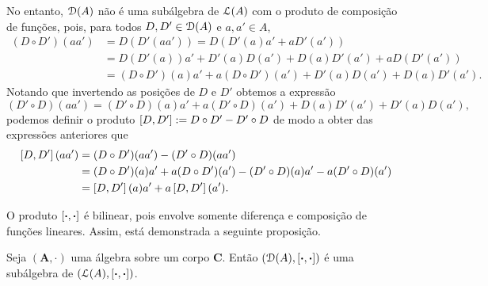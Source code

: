 No entanto, $\mathcal{D}(A)$ não é uma subálgebra de $\mathcal{L}(A)$ com o produto de composição de funções, pois, para todos $D,D' \in \mathcal{D}(A)$ e $a,a' \in A$,
	\begin{align*}
	(D \circ D')(aa') &= D(D'(aa')) = D(D'(a)a' + aD'(a')) \\
		&= D(D'(a))a' + D'(a)D(a') + D(a)D'(a') + a D(D'(a')) \\
		&= (D \circ D')(a)a' + a (D \circ D')(a') + D'(a)D(a') + D(a)D'(a').
	\end{align*}
Notando que invertendo as posições de $D$ e $D'$ obtemos a expressão
	\begin{equation*}
	(D' \circ D)(aa') = (D' \circ D)(a)a' + a (D' \circ D)(a') + D(a)D'(a') + D'(a)D(a'),
	\end{equation*}
podemos definir o produto $\left[{D},{D'}\right] := D \circ D' - D' \circ D$ de modo a obter das expressões anteriores que
	\begin{align*}
	\left[{D},{D'}\right](aa') &= (D \circ D')(aa') - (D' \circ D)(aa') \\
		&= (D \circ D')(a)a' + a (D \circ D')(a') - (D' \circ D)(a)a' - a (D' \circ D)(a') \\
		&= \left[{D},{D'}\right](a)a' + a\left[{D},{D'}\right](a').
	\end{align*}

O produto $\left[{\bm{\cdot}},{\bm{\cdot}}\right]$ é bilinear, pois envolve somente diferença e composição de funções lineares. Assim, está demonstrada a seguinte proposição.

\begin{proposition}
\label{alge:prop.algebra.colchete.deriv}
Seja $(\bm A,\cdot)$ uma álgebra sobre um corpo $\bm C$. Então $(\mathcal{D}(A),\left[{\bm{\cdot}},{\bm{\cdot}}\right])$ é uma subálgebra de $(\mathcal{L}(A),\left[{\bm{\cdot}},{\bm{\cdot}}\right])$.
\end{proposition}







